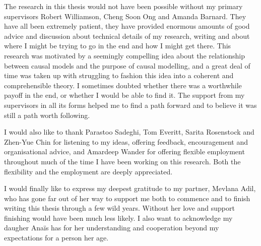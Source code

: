 \begin{acknowledgements}
\addchaptertocentry{\acknowledgementname} %
\vspace{0.4cm}
\begingroup
\normalsize
The research in this thesis would not have been possible without my primary supervisors Robert Williamson, Cheng Soon Ong and Amanda Barnard. They have all been extremely patient, they have provided enormous amounts of good advice and discussion about technical details of my research, writing and about where I might be trying to go in the end and how I might get there. This research was motivated by a seemingly compelling idea about the relationship between causal models and the purpose of causal modelling, and a great deal of time was taken up with struggling to fashion this idea into a coherent and comprehensible theory. I sometimes doubted whether there was a worthwhile payoff in the end, or whether I would be able to find it. The support from my supervisors in all its forms helped me to find a path forward and to believe it was still a path worth following.

I would also like to thank Parastoo Sadeghi, Tom Everitt, Sarita Rosenstock and Zhen-Yue Chin for listening to my ideas, offering feedback, encouragement and organisational advice, and Amardeep Wander for offering flexible employment throughout much of the time I have been working on this research. Both the flexibility and the employment are deeply appreciated.

I would finally like to express my deepest gratitude to my partner, Mevlana Adil, who has gone far out of her way to support me both to commence and to finish writing this thesis through a few wild years. Without her love and support finishing would have been much less likely. I also want to acknowledge my daugher Ana\"is has for her understanding and cooperation beyond my expectations for a person her age.
\endgroup
\end{acknowledgements}


